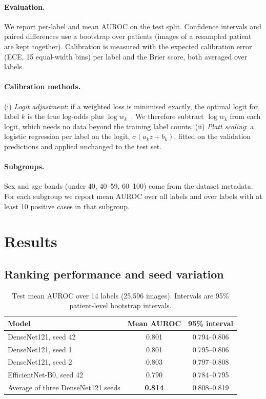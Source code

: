 \documentclass[11pt]{article}
\begin{document}
\paragraph{Evaluation.} We report per-label and mean AUROC on the test split. Confidence intervals and paired differences use a bootstrap over patients (images of a resampled patient are kept together). Calibration is measured with the expected calibration error (ECE, 15 equal-width bins) per label and the Brier score, both averaged over labels.

\paragraph{Calibration methods.} (i) \emph{Logit adjustment}: if a weighted loss is minimised exactly, the optimal logit for label $k$ is the true log-odds plus $\log w_k$~\cite{caplin2022calibrating,menon2021logit}. We therefore subtract $\log w_k$ from each logit, which needs no data beyond the training label counts. (ii) \emph{Platt scaling}: a logistic regression per label on the logit, $\sigma(a_k z + b_k)$, fitted on the validation predictions and applied unchanged to the test set.

\paragraph{Subgroups.} Sex and age bands (under 40, 40--59, 60--100) come from the dataset metadata. For each subgroup we report mean AUROC over all labels and over labels with at least 10 positive cases in that subgroup.

\section{Results}

\subsection{Ranking performance and seed variation}
\label{sec:auroc}

\begin{table}[t]
\centering
\caption{Test mean AUROC over 14 labels (25,596 images). Intervals are 95\% patient-level bootstrap intervals.}
\label{tab:auroc}
\begin{tabular}{lcc}
\toprule
Model & Mean AUROC & 95\% interval \\
\midrule
DenseNet121, seed 42 & 0.801 & 0.794--0.806 \\
DenseNet121, seed 1 & 0.801 & 0.795--0.806 \\
DenseNet121, seed 2 & 0.803 & 0.797--0.808 \\
EfficientNet-B0, seed 42 & 0.790 & 0.784--0.795 \\
Average of three DenseNet121 seeds & \textbf{0.814} & 0.808--0.819 \\
\bottomrule
\end{tabular}
\end{table}
\end{document}

